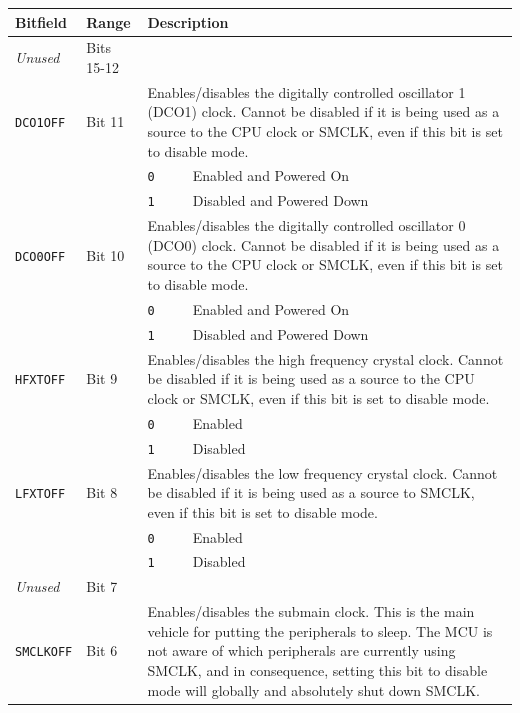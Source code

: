 \begin{tabularx}{\textwidth}{ l l l X }
\textbf{Bitfield} & \textbf{Range} & \multicolumn{2}{X}{\textbf{Description}} \\ \hline
\textit{Unused} & Bits 15-12 & \multicolumn{2}{X}{} \\
\hline
\texttt{DCO1OFF} & Bit 11 & \multicolumn{2}{X}{Enables/disables the digitally controlled oscillator 1 (DCO1) clock. Cannot be disabled if it is being used as a source to the CPU clock or SMCLK, even if this bit is set to disable mode.} \\
 & & \texttt{0} & Enabled and Powered On \\
 & & \cellcolor{tablehighlightcolor}\texttt{1} & \cellcolor{tablehighlightcolor}Disabled and Powered Down \\
\hline
\texttt{DCO0OFF} & Bit 10 & \multicolumn{2}{X}{Enables/disables the digitally controlled oscillator 0 (DCO0) clock. Cannot be disabled if it is being used as a source to the CPU clock or SMCLK, even if this bit is set to disable mode.} \\
 & & \texttt{0} & Enabled and Powered On \\
 & & \cellcolor{tablehighlightcolor}\texttt{1} & \cellcolor{tablehighlightcolor}Disabled and Powered Down \\
\hline
\texttt{HFXTOFF} & Bit 9 & \multicolumn{2}{X}{Enables/disables the high frequency crystal clock. Cannot be disabled if it is being used as a source to the CPU clock or SMCLK, even if this bit is set to disable mode.} \\
 & & \texttt{0} & Enabled \\
 & & \cellcolor{tablehighlightcolor}\texttt{1} & \cellcolor{tablehighlightcolor}Disabled \\
\hline
\texttt{LFXTOFF} & Bit 8 & \multicolumn{2}{X}{Enables/disables the low frequency crystal clock. Cannot be disabled if it is being used as a source to SMCLK, even if this bit is set to disable mode.} \\
 & & \texttt{0} & Enabled \\
 & & \cellcolor{tablehighlightcolor}\texttt{1} & \cellcolor{tablehighlightcolor}Disabled \\
\hline
\textit{Unused} & Bit 7 & \multicolumn{2}{X}{} \\
\hline
\texttt{SMCLKOFF} & Bit 6 & \multicolumn{2}{X}{Enables/disables the submain clock. This is the main vehicle for putting the peripherals to sleep. The MCU is not aware of which peripherals are currently using SMCLK, and in consequence, setting this bit to disable mode will globally and absolutely shut down SMCLK.} \\

\end{tabularx}
